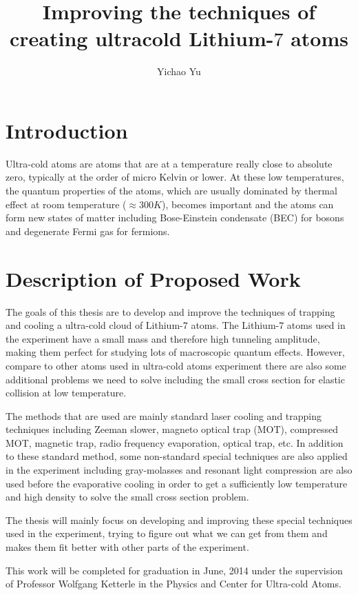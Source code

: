 \documentclass[10pt,fleqn]{article}
\title{Improving the techniques of creating ultracold Lithium-$7$ atoms}
\author{Yichao Yu}
\begin{document}
\maketitle
\section*{Introduction}
Ultra-cold atoms are atoms that are at a temperature really close to absolute zero, typically at the order of micro Kelvin or lower. At these low temperatures, the quantum properties of the atoms, which are usually dominated by thermal effect at room temperature ($\approx300K$), becomes important and the atoms can form new states of matter including Bose-Einstein condensate (BEC) for bosons and degenerate Fermi gas for fermions.
\section*{Description of Proposed Work}
The goals of this thesis are to develop and improve the techniques of trapping and cooling a ultra-cold cloud of Lithium-$7$ atoms. The Lithium-$7$ atoms used in the experiment have a small mass and therefore high tunneling amplitude, making them perfect for studying lots of macroscopic quantum effects. However, compare to other atoms used in ultra-cold atoms experiment there are also some additional problems we need to solve including the small cross section for elastic collision at low temperature.

\par
The methods that are used are mainly standard laser cooling and trapping techniques including Zeeman slower, magneto optical trap (MOT), compressed MOT, magnetic trap, radio frequency evaporation, optical trap, etc. In addition to these standard method, some non-standard special techniques are also applied in the experiment including gray-molasses and resonant light compression are also used before the evaporative cooling in order to get a sufficiently low temperature and high density to solve the small cross section problem.

\par
The thesis will mainly focus on developing and improving these special techniques used in the experiment, trying to figure out what we can get from them and makes them fit better with other parts of the experiment.

\par

This work will be completed for graduation in June, 2014 under the supervision of Professor Wolfgang Ketterle in the Physics and Center for Ultra-cold Atoms.
\end{document}
